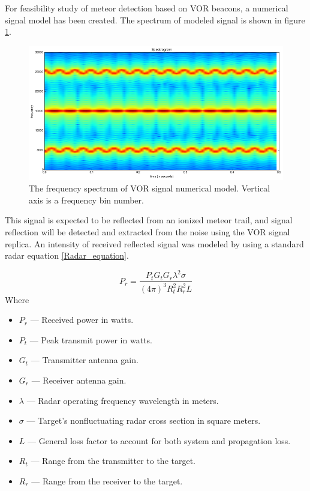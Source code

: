 \documentclass[twoside]{ctuthesis}
\theoremstyle{plain}
\theoremstyle{definition}
\theoremstyle{note}
\begin{document}
For feasibility study of meteor detection based on VOR beacons, a numerical signal model has been created. The spectrum of modeled signal is shown in figure \ref{VOR_signal}.

\begin{figure}
\includegraphics[width=\textwidth]{./img/VOR_signal.png}
\caption{The frequency spectrum of VOR signal numerical model. Vertical axis is a frequency bin number.}
\label{VOR_signal}
\end{figure}

This signal is expected to be reflected from an ionized meteor trail, and signal reflection will be detected and extracted from the noise using the VOR signal replica. An intensity of received reflected signal was modeled by using a standard radar equation \ref{Radar_equation}.

\begin{equation}
P_r = \frac{P_t G_t G_r \lambda^2 \sigma}{(4 \pi)^3 R_t ^2 R_r ^2 L}
\label{Radar_equation}
\end{equation}
Where 
\begin{itemize}
\item $P_r$ — Received power in watts.
\item $P_t$ — Peak transmit power in watts.
\item $G_t$ — Transmitter antenna gain.
\item $G_r$ — Receiver antenna gain.
\item $\lambda$ — Radar operating frequency wavelength in meters.
\item $\sigma$ — Target's nonfluctuating radar cross section in square meters.
\item $L$ — General loss factor to account for both system and propagation loss.
\item $R_t$ — Range from the transmitter to the target.
\item $R_r$ — Range from the receiver to the target. 
\end{itemize}
\end{document}
